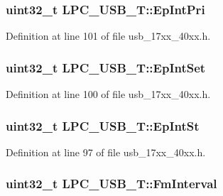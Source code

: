 \subsubsection[{\texorpdfstring{Ep\+Int\+Pri}{EpIntPri}}]{ uint32\+\_\+t L\+P\+C\+\_\+\+U\+S\+B\+\_\+\+T\+::\+Ep\+Int\+Pri}\hypertarget{structLPC__USB__T_a1ed6a1c27eb7d9eb539ff4c0a9eff421}{}\label{structLPC__USB__T_a1ed6a1c27eb7d9eb539ff4c0a9eff421}


Definition at line 101 of file usb\+\_\+17xx\+\_\+40xx.\+h.

\subsubsection[{\texorpdfstring{Ep\+Int\+Set}{EpIntSet}}]{ uint32\+\_\+t L\+P\+C\+\_\+\+U\+S\+B\+\_\+\+T\+::\+Ep\+Int\+Set}\hypertarget{structLPC__USB__T_aa5d010fbc6f9dbe08430bf40c285f5b8}{}\label{structLPC__USB__T_aa5d010fbc6f9dbe08430bf40c285f5b8}


Definition at line 100 of file usb\+\_\+17xx\+\_\+40xx.\+h.

\subsubsection[{\texorpdfstring{Ep\+Int\+St}{EpIntSt}}]{ uint32\+\_\+t L\+P\+C\+\_\+\+U\+S\+B\+\_\+\+T\+::\+Ep\+Int\+St}\hypertarget{structLPC__USB__T_a2d1aede28fe7c52fb98439a21b499a9f}{}\label{structLPC__USB__T_a2d1aede28fe7c52fb98439a21b499a9f}


Definition at line 97 of file usb\+\_\+17xx\+\_\+40xx.\+h.

\subsubsection[{\texorpdfstring{Fm\+Interval}{FmInterval}}]{ uint32\+\_\+t L\+P\+C\+\_\+\+U\+S\+B\+\_\+\+T\+::\+Fm\+Interval}\hypertarget{structLPC__USB__T_a44a11016066aa85694d895fdc65a573d}{}\label{structLPC__USB__T_a44a11016066aa85694d895fdc65a573d}


